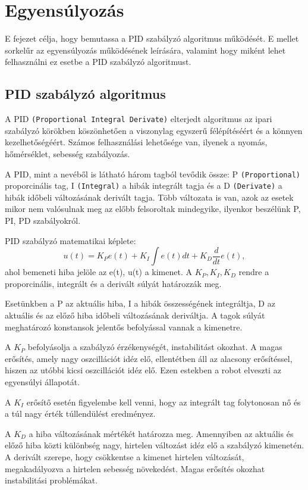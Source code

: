 \chapter{Egyensúlyozás}\label{ch:EGYENSULY}
\begin{osszefoglal}
E fejezet célja, hogy bemutassa a PID szabályzó algoritmus működését. E mellet sorkelűr az egyensúlyozás működésének leírására, valamint hogy miként lehet felhasználni ez esetbe a PID szabályzó algoritmust.
\end{osszefoglal}

\section{PID szabályzó algoritmus}\label{sec:EGYENSULY:pid}
A PID \texttt{(Proportional Integral Derivate)} elterjedt algoritmus az ipari szabályzó körökben köszönhetően a viszonylag egyszerű félépítéséért és a könnyen kezelhetőségéért. Számos felhasználási lehetősége van, ilyenek a nyomás, hőmérséklet, sebesség szabályozás.

A PID, mint a nevéből is látható három tagból tevődik össze: P \texttt{(Proportional)} proporcinális tag, I \texttt{(Integral)} a hibák integrált tagja és a D \texttt{(Derivate)} a hibák időbeli változásának derivált tagja. Több változata is van, azok az esetek mikor nem valósulnak meg az előbb felsoroltak mindegyike, ilyenkor beszélünk P, PI, PD szabályokról.

PID szabályzó matematikai képlete: $$u(t)=K_{P}e(t)+K_{I}\int e(t)dt+K_{D}\frac{d}{dt}e(t),$$ ahol bemeneti hiba jelöle az e(t), u(t) a kimenet. A $K_{P}, K_{I}, K_{D}$ rendre a proporcinális, integrált és a derivált súlyát határozzák meg.

Esetünkben a P az aktuális hiba, I a hibák összességének integráltja, D az aktuális és az előző hiba időbeli változásának deriváltja. A tagok súlyát meghatározó konstansok jelentős befolyással vannak a kimenetre. 

A $K_{P}$ befolyásolja a szabályzó érzékenységét, instabilitást okozhat. A magas erősítés, amely nagy oszcillációt idéz elő, ellentétben áll az alacsony erősítéssel, hiszen az utóbbi kicsi oszcillációt idéz elő. Ezen estekben a robot elveszti az egyensúlyi állapotát. 

A $K_{I}$ erősítő esetén figyelembe kell venni, hogy az integrált tag folytonosan nő és a túl nagy érték túllendülést eredményez. 

A $K_{D}$ a hiba változásának mértékét határozza meg. Amennyiben az aktuális és előző hiba közti különbség nagy, hirtelen változást idéz elő a szabályzó kimenetén. A derivált szerepe, hogy csökkentse a kimenet hirtelen változását, megakadályozva a hirtelen sebesség növekedést. Magas erősítés okozhat instabilitási problémákat.

